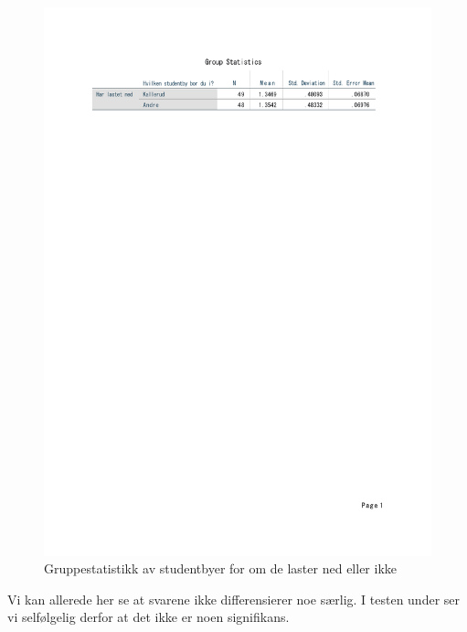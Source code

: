 \begin{figure}[H]
    \centering
    \includegraphics[scale=0.7]{case_1/bilder/studentby_lasterned_ttest_stats.pdf}
    \caption{Gruppestatistikk av studentbyer for om de laster ned eller ikke}
    \label{fig:case1-studby_lasterned_ttest_stats}
\end{figure}

Vi kan allerede her se at svarene ikke differensierer noe særlig. I testen under ser vi selfølgelig derfor at det ikke er noen signifikans.

